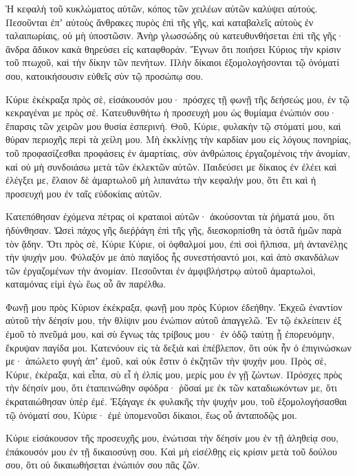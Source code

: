 \begin{spacing}{1.1}
\begin{multicols}{2}
Ἡ κεφαλὴ τοῦ κυκλώματος αὐτῶν, κόπος τῶν χειλέων αὐτῶν καλύψει αὐτούς.
Πεσοῦνται ἐπʼ αὐτοὺς ἄνθρακες πυρὸς ἐπὶ τῆς γῆς, καὶ καταβαλεῖς αὐτοὺς ἐν ταλαιπωρίαις, οὐ μὴ ὑποστῶσιν.
Ἀνὴρ γλωσσώδης οὐ κατευθυνθήσεται ἐπὶ τῆς γῆς· ἄνδρα ἄδικον κακὰ θηρεύσει εἰς καταφθοράν.
Ἔγνων ὅτι ποιήσει Κύριος τὴν κρίσιν τοῦ πτωχοῦ, καὶ τὴν δίκην τῶν πενήτων.
Πλὴν δίκαιοι ἐξομολογήσονται τῷ ὀνόματί σου, κατοικήσουσιν εὐθεῖς σὺν τῷ προσώπῳ σου.

Κύριε ἐκέκραξα πρὸς σὲ, εἰσάκουσόν μου· πρόσχες τῇ φωνῇ τῆς δεήσεώς μου, ἐν τῷ κεκραγέναι με πρὸς σέ.
Κατευθυνθήτω ἡ προσευχή μου ὡς θυμίαμα ἐνώπιόν σου· ἔπαρσις τῶν χειρῶν μου θυσία ἑσπερινή.
Θοῦ, Κύριε, φυλακὴν τῷ στόματί μου, καὶ θύραν περιοχῆς περὶ τὰ χείλη μου.
Μὴ ἐκκλίνῃς τὴν καρδίαν μου εἰς λόγους πονηρίας, τοῦ προφασίζεσθαι προφάσεις ἐν ἁμαρτίαις, σὺν ἀνθρώποις ἐργαζομένοις τὴν ἀνομίαν, καὶ οὐ μὴ συνδοιάσω μετὰ τῶν ἐκλεκτῶν αὐτῶν.
Παιδεύσει με δίκαιος ἐν ἐλέει καὶ ἐλέγξει με, ἔλαιον δὲ ἁμαρτωλοῦ μὴ λιπανάτω τὴν κεφαλήν μου, ὅτι ἔτι καὶ ἡ προσευχή μου ἐν ταῖς εὐδοκίαις αὐτῶν.

Κατεπόθησαν ἐχόμενα πέτρας οἱ κραταιοὶ αὐτῶν· ἀκούσονται τὰ ῥήματά μου, ὅτι ἠδύνθησαν.
Ὡσεὶ πάχος γῆς διεῤῥάγη ἐπὶ τῆς γῆς, διεσκορπίσθη τὰ ὀστᾶ ἡμῶν παρὰ τὸν ᾅδην.
Ὅτι πρὸς σὲ, Κύριε Κύριε, οἱ ὀφθαλμοί μου, ἐπὶ σοὶ ἤλπισα, μὴ ἀντανέλῃς τὴν ψυχήν μου.
Φύλαξόν με ἀπὸ παγίδος ἧς συνεστήσαντό μοι, καὶ ἀπὸ σκανδάλων τῶν ἐργαζομένων τὴν ἀνομίαν.
Πεσοῦνται ἐν ἀμφιβλήστρῳ αὐτοῦ ἁμαρτωλοὶ, καταμόνας εἰμὶ ἐγὼ ἕως οὗ ἂν παρέλθω.

Φωνῇ μου πρὸς Κύριον ἐκέκραξα, φωνῇ μου πρὸς Κύριον ἐδεήθην.
Ἐκχεῶ ἐναντίον αὐτοῦ τὴν δέησίν μου, τὴν θλίψιν μου ἐνώπιον αὐτοῦ ἀπαγγελῶ.
Ἐν τῷ ἐκλείπειν ἐξ ἐμοῦ τὸ πνεῦμά μου, καὶ σὺ ἔγνως τὰς τρίβους μου· ἐν ὁδῷ ταύτῃ ᾗ ἐπορευόμην, ἔκρυψαν παγίδα μοι.
Κατενόουν εἰς τὰ δεξιὰ καὶ ἐπέβλεπον, ὅτι οὐκ ἦν ὁ ἐπιγινώσκων με· ἀπώλετο φυγὴ ἀπʼ ἐμοῦ, καὶ οὐκ ἔστιν ὁ ἐκζητῶν τὴν ψυχήν μου.
Πρὸς σὲ, Κύριε, ἐκέραξα, καὶ εἶπα, σὺ εἶ ἡ ἐλπίς μου, μερίς μου ἐν γῇ ζώντων.
Πρόσχες πρὸς τὴν δέησίν μου, ὅτι ἐταπεινώθην σφόδρα· ῥῦσαί με ἐκ τῶν καταδιωκόντων με, ὅτι ἐκραταιώθησαν ὑπὲρ ἐμέ.
Ἐξάγαγε ἐκ φυλακῆς τὴν ψυχήν μου, τοῦ ἐξομολογήσασθαι τῷ ὀνόματί σου, Κύριε· ἐμὲ ὑπομενοῦσι δίκαιοι, ἕως οὗ ἀνταποδῷς μοι.

Κύριε εἰσάκουσον τῆς προσευχῆς μου, ἐνώτισαι τὴν δέησίν μου ἐν τῇ ἀληθείᾳ σου, ἐπάκουσόν μου ἐν τῇ δικαιοσύνῃ σου.
Καὶ μὴ εἰσέλθῃς εἰς κρίσιν μετὰ τοῦ δούλου σου, ὅτι οὐ δικαιωθήσεται ἐνώπιόν σου πᾶς ζῶν.


\end{multicols}
\end{spacing}
